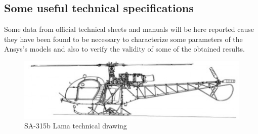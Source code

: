 \clearpage
\subsection*{Some useful technical specifications}
\noindent
{}
Some data from official technical sheets and manuals will be here reported cause they have been found to be necessary to characterize some parameters of the Ansys's models and also to verify the validity of some of the obtained results. \\  


\medskip
\begin{figure}[h]
	\begin{center}
		\centering  		 		
		\includegraphics[width=1\linewidth]{PICTURES/2_Lama_truss/PNG/side_view.png}
	\end{center}
	\caption {SA-315b Lama technical drawing}
\end{figure}

